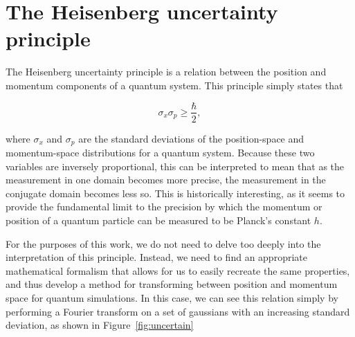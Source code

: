 \section{The Heisenberg uncertainty principle}

The Heisenberg uncertainty principle is a relation between the position and momentum components of a quantum system.
This principle simply states that

$$
\sigma_x \sigma_p \geq \frac{\hbar}{2},
$$

\noindent where $\sigma_x$ and $\sigma_p$ are the standard deviations of the position-space and momentum-space distributions for a quantum system.
Because these two variables are inversely proportional, this can be interpreted to mean that as the measurement in one domain becomes more precise, the measurement in the conjugate domain becomes less so.
This is historically interesting, as it seems to provide the fundamental limit to the precision by which the momentum or position of a quantum particle can be measured to be Planck's constant $h$.

For the purposes of this work, we do not need to delve too deeply into the interpretation of this principle.
Instead, we need to find an appropriate mathematical formalism that allows for us to easily recreate the same properties, and thus develop a method for transforming between position and momentum space for quantum simulations.
In this case, we can see this relation simply by performing a Fourier transform on a set of gaussians with an increasing standard deviation, as shown in Figure~\ref{fig:uncertain}

